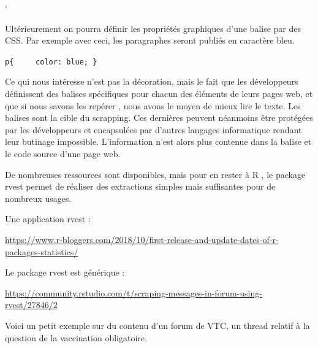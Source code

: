 \documentclass[
  letterpaper,
  DIV=11,
  numbers=noendperiod]{scrreprt}
\begin{document}
`

Ultérieurement on pourra définir les propriétés graphiques d'une balise
par des CSS. Par exemple avec ceci, les paragraphes seront publiés en
caractère bleu.

\texttt{p\{\ \ \ \ \ color:\ blue;\ \}}

Ce qui nous intéresse n'est pas la décoration, mais le fait que les
développeurs définissent des balises spécifiques pour chacun des
éléments de leurs pages web, et que si nous savons les repérer , nous
avons le moyen de mieux lire le texte. Les balises sont la cible du
scrapping. Ces dernières peuvent néanmoins être protégées par les
développeurs et encapsulées par d'autres langages informatique rendant
leur butinage impossible. L'information n'est alors plus contenue dans
la balise et le code source d'une page web.

De nombreuses ressources sont disponibles, mais pour en rester à R , le
package rvest permet de réaliser des extractions simples mais
suffisantes pour de nombreux usages.

Une application rvest :

\url{https://www.r-bloggers.com/2018/10/first-release-and-update-dates-of-r-packages-statistics/}

Le package rvest est générique :

\url{https://community.rstudio.com/t/scraping-messages-in-forum-using-rvest/27846/2}

Voici un petit exemple sur du contenu d'un forum de VTC, un thread
relatif à la question de la vaccination obligatoire.
\end{document}
